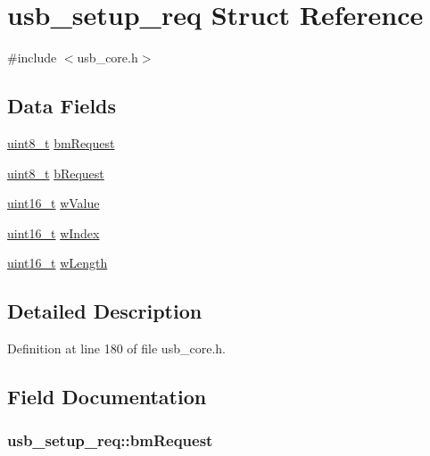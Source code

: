\hypertarget{structusb__setup__req}{\section{usb\-\_\-setup\-\_\-req Struct Reference}
\label{structusb__setup__req}
}


{\ttfamily \#include $<$usb\-\_\-core.\-h$>$}

\subsection*{Data Fields}
\begin{DoxyCompactItemize}
\item 
\hyperlink{stdint_8h_aba7bc1797add20fe3efdf37ced1182c5}{uint8\-\_\-t} \hyperlink{structusb__setup__req_aa114215d5692aa3529d233dbafafb27a}{bm\-Request}
\item 
\hyperlink{stdint_8h_aba7bc1797add20fe3efdf37ced1182c5}{uint8\-\_\-t} \hyperlink{structusb__setup__req_a2205c30d387eb386aec4b91f7b9d6794}{b\-Request}
\item 
\hyperlink{stdint_8h_a273cf69d639a59973b6019625df33e30}{uint16\-\_\-t} \hyperlink{structusb__setup__req_a8253ffdbf10b56db85acc3377a381c48}{w\-Value}
\item 
\hyperlink{stdint_8h_a273cf69d639a59973b6019625df33e30}{uint16\-\_\-t} \hyperlink{structusb__setup__req_a26eb00d046d31e91605f8fc1c164581d}{w\-Index}
\item 
\hyperlink{stdint_8h_a273cf69d639a59973b6019625df33e30}{uint16\-\_\-t} \hyperlink{structusb__setup__req_ab287b73d688581778da556c9afeffb6b}{w\-Length}
\end{DoxyCompactItemize}


\subsection{Detailed Description}


Definition at line 180 of file usb\-\_\-core.\-h.



\subsection{Field Documentation}
\hypertarget{structusb__setup__req_aa114215d5692aa3529d233dbafafb27a}{
\subsubsection[{bm\-Request}]{ usb\-\_\-setup\-\_\-req\-::bm\-Request}}\label{structusb__setup__req_aa114215d5692aa3529d233dbafafb27a}



